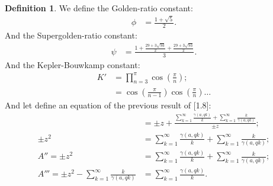 \documentclass[10pt]{article}
\theoremstyle{plain}
\theoremstyle{definition}
\newtheorem{definition}[theorem]{Definition}
\theoremstyle{remark}
\begin{document}
	\begin{definition}
		We define the Golden-ratio constant:
		\begin{align*}
			\phi &= \frac{1+\sqrt{5}}{2}.
		\end{align*}
		And the Supergolden-ratio constant:
		\begin{align*}
			\psi &= \frac{1+\frac{29+3\sqrt{93}}{2}+\frac{29+3\sqrt{93}}{2}}{3}.
		\end{align*}
		And the Kepler-Bouwkamp constant:
		\begin{align*}
			K' &= \prod_{n=3}^{\pi} \cos(\frac{\pi}{n});\\
			&=  \cos(\frac{\pi}{n-1}) \cos(\frac{\pi}{n}) \dots
		\end{align*}
		And let define an equation of the previous result of [1.8]:
		\begin{align*}
			&= \pm z + \frac{\sum_{k=1}^{\infty} \frac{\gamma(a, qk)}{k} + \sum_{k=1}^{\infty}\frac{k}{\gamma(a, qk)}}{\pm z};\\
			\pm z^2 &= \sum_{k=1}^{\infty} \frac{\gamma(a, qk)}{k} + \sum_{k=1}^{\infty}\frac{k}{\gamma(a, qk)};\\
			A'' = \pm z^2 &= \sum_{k=1}^{\infty} \frac{\gamma(a, qk)}{k} + \sum_{k=1}^{\infty}\frac{k}{\gamma(a, qk)};\\
			A''' = \pm z^{2} - \sum_{k=1}^{\infty}\frac{k}{\gamma(a, qk)} &= \sum_{k=1}^{\infty} \frac{\gamma(a, qk)}{k}.
		\end{align*}
	\end{definition}
	
	\nocite{*}
	
	
	
	
\end{document}
